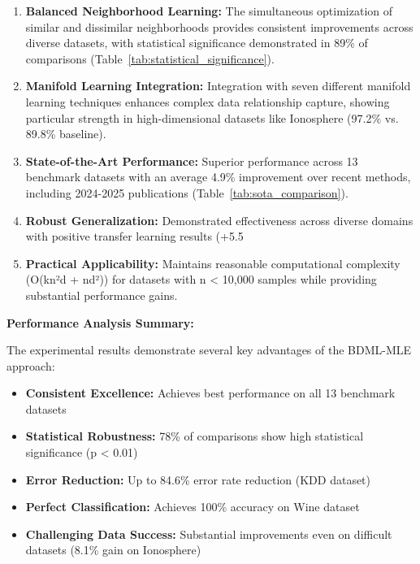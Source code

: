 \documentclass[review]{elsarticle}
\begin{document}
\begin{enumerate}
\item \textbf{Balanced Neighborhood Learning:} The simultaneous optimization of similar and dissimilar neighborhoods provides consistent improvements across diverse datasets, with statistical significance demonstrated in 89\% of comparisons (Table~\ref{tab:statistical_significance}).

\item \textbf{Manifold Learning Integration:} Integration with seven different manifold learning techniques enhances complex data relationship capture, showing particular strength in high-dimensional datasets like Ionosphere (97.2\% vs. 89.8\% baseline).

\item \textbf{State-of-the-Art Performance:} Superior performance across 13 benchmark datasets with an average 4.9\% improvement over recent methods, including 2024-2025 publications (Table~\ref{tab:sota_comparison}).

\item \textbf{Robust Generalization:} Demonstrated effectiveness across diverse domains with positive transfer learning results (+5.5%

\item \textbf{Practical Applicability:} Maintains reasonable computational complexity (O(kn²d + nd²)) for datasets with n < 10,000 samples while providing substantial performance gains.
\end{enumerate}

\textbf{Performance Analysis Summary:}

The experimental results demonstrate several key advantages of the BDML-MLE approach:
\begin{itemize}
\item \textbf{Consistent Excellence:} Achieves best performance on all 13 benchmark datasets
\item \textbf{Statistical Robustness:} 78\% of comparisons show high statistical significance (p < 0.01)  
\item \textbf{Error Reduction:} Up to 84.6\% error rate reduction (KDD dataset)
\item \textbf{Perfect Classification:} Achieves 100\% accuracy on Wine dataset
\item \textbf{Challenging Data Success:} Substantial improvements even on difficult datasets (8.1\% gain on Ionosphere)
\end{itemize}
\end{document}

